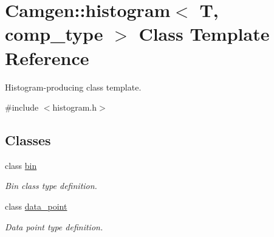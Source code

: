 \hypertarget{a00280}{\section{Camgen\-:\-:histogram$<$ T, comp\-\_\-type $>$ Class Template Reference}
\label{a00280}
}


Histogram-\/producing class template.  




{\ttfamily \#include $<$histogram.\-h$>$}

\subsection*{Classes}
\begin{DoxyCompactItemize}
\item 
class \hyperlink{a00028}{bin}
\begin{DoxyCompactList}\small\item\em Bin class type definition. \end{DoxyCompactList}\item 
class \hyperlink{a00116}{data\-\_\-point}
\begin{DoxyCompactList}\small\item\em Data point type definition. \end{DoxyCompactList}\end{DoxyCompactItemize}
